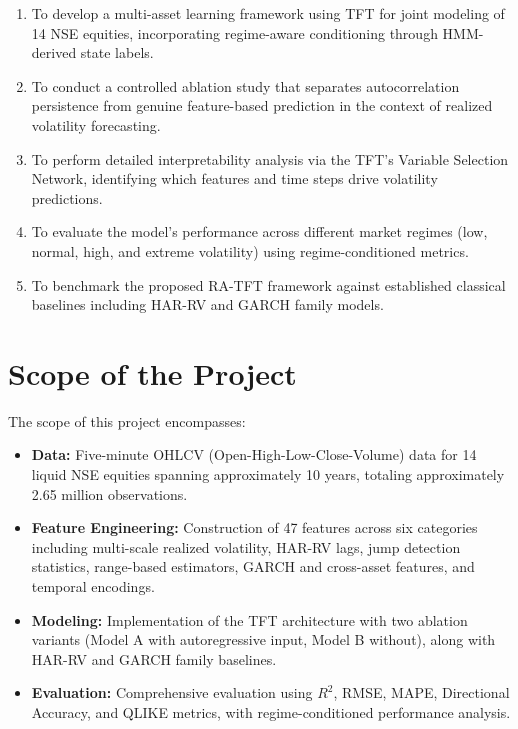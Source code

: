 \begin{enumerate}
    \item To develop a multi-asset learning framework using TFT for joint modeling of 14 NSE equities, incorporating regime-aware conditioning through HMM-derived state labels.
    \item To conduct a controlled ablation study that separates autocorrelation persistence from genuine feature-based prediction in the context of realized volatility forecasting.
    \item To perform detailed interpretability analysis via the TFT's Variable Selection Network, identifying which features and time steps drive volatility predictions.
    \item To evaluate the model's performance across different market regimes (low, normal, high, and extreme volatility) using regime-conditioned metrics.
    \item To benchmark the proposed RA-TFT framework against established classical baselines including HAR-RV and GARCH family models.
\end{enumerate}

\section{Scope of the Project}

The scope of this project encompasses:

\begin{itemize}
    \item \textbf{Data:} Five-minute OHLCV (Open-High-Low-Close-Volume) data for 14 liquid NSE equities spanning approximately 10 years, totaling approximately 2.65 million observations.
    \item \textbf{Feature Engineering:} Construction of 47 features across six categories including multi-scale realized volatility, HAR-RV lags, jump detection statistics, range-based estimators, GARCH and cross-asset features, and temporal encodings.
    \item \textbf{Modeling:} Implementation of the TFT architecture with two ablation variants (Model A with autoregressive input, Model B without), along with HAR-RV and GARCH family baselines.
    \item \textbf{Evaluation:} Comprehensive evaluation using $R^2$, RMSE, MAPE, Directional Accuracy, and QLIKE metrics, with regime-conditioned performance analysis.
\end{itemize}


